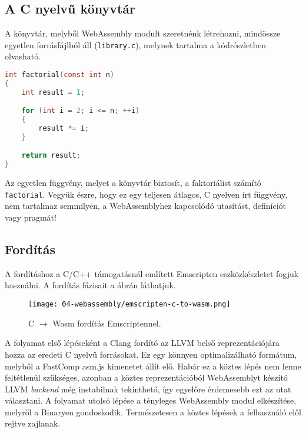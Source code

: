 \subsection{A C nyelvű könyvtár}

A könyvtár, melyből WebAssembly modult szeretnénk létrehozni, mindössze egyetlen forrásfájlból áll (\texttt{library.c}), melynek tartalma a  kódrészletben olvasható.

\begin{lstlisting}[language=C, caption={A fordítandó \texttt{library.c} fájl.}, captionpos=b, label=Listing::WebAssembly::CToWasmLibrary]
int factorial(const int n)
{
    int result = 1;

    for (int i = 2; i <= n; ++i)
    {
        result *= i;
    }

    return result;
}
\end{lstlisting}

Az egyetlen függvény, melyet a könyvtár biztosít, a faktoriálist számító \texttt{factorial}. Vegyük észre, hogy ez egy teljesen átlagos, C nyelven írt függvény, nem tartalmaz semmilyen, a WebAssemblyhez kapcsolódó utasítást, definíciót vagy pragmát!

\subsection{Fordítás}
\label{Subsection::WebAssembly::Forditas}

A fordításhoz a C/C++ támogatásnál említett Emscripten eszközkészletet fogjuk használni. A fordítás fázisait a   ábrán láthatjuk.

\begin{figure}[h]
    \centering
    \texttt{[image: 04-webassembly/emscripten-c-to-wasm.png]}
    \caption{C $\rightarrow$ Wasm fordítás Emscriptennel.}
    \label{Figure::WebAssembly::EmscriptenCToWebAssembly}
\end{figure}

A folyamat első lépéseként a Clang fordító az LLVM belső reprezentációjára hozza az eredeti C nyelvű forrásokat. Ez egy könnyen optimalizálható formátum, melyből a FastComp asm.js kimenetet állít elő. Habár ez a köztes lépés nem lenne feltétlenül szükséges, azonban a köztes reprezentációból WebAssemblyt készítő LLVM \textit{backend} még instabilnak tekinthető, így egyelőre érdemesebb ezt az utat választani. A folyamat utolsó lépése a tényleges WebAssembly modul elkészítése, melyről a Binaryen gondoskodik. Természetesen a köztes lépések a felhasználó elől rejtve zajlanak.

